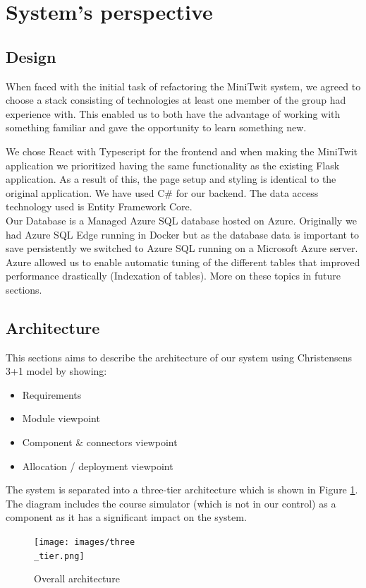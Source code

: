 \section{System's perspective}
\subsection{Design}
When faced with the initial task of refactoring the MiniTwit system, we agreed to choose a stack consisting of technologies at least one member of the group had experience with.
This enabled us to both have the advantage of working with something familiar and gave the opportunity to learn something new. 

We chose React with Typescript for the frontend and when making the MiniTwit application we prioritized having the same functionality as the existing Flask application. As a result of this, the page setup and styling is identical to the original application.
We have used C\# for our backend. The data access technology used is Entity Framework Core.\\

Our Database is a Managed Azure SQL database hosted on Azure. Originally we had Azure SQL Edge running in Docker but as the database data is important to save persistently we switched to Azure SQL running on a Microsoft Azure server. Azure allowed us to enable automatic tuning of the different tables that improved performance drastically (Indexation of tables). More on these topics in future sections.

\subsection{Architecture}
This sections aims to describe the architecture of our system using Christensens 3+1 model \cite{architecturemodel} by showing:
\begin{itemize}
    \item Requirements
    \item Module viewpoint 
    \item Component \& connectors viewpoint 
    \item Allocation / deployment viewpoint
\end{itemize}

The system is separated into a three-tier architecture which is shown in Figure \ref{fig:Threetier}.
The diagram includes the course simulator (which is not in our control) as a component as it has a significant impact on the system.
\begin{figure}[H]
 \centering
 \texttt{[image: images/three\\\_tier.png]}
 \caption{Overall architecture}
 \label{fig:Threetier}
\end{figure}

